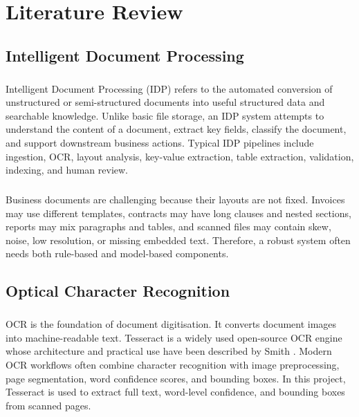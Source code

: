 \chapter{Literature Review}
\label{chap:literature_review}

\section{Intelligent Document Processing}
\paragraph{} Intelligent Document Processing (IDP) refers to the automated conversion of unstructured or semi-structured documents into useful structured data and searchable knowledge. Unlike basic file storage, an IDP system attempts to understand the content of a document, extract key fields, classify the document, and support downstream business actions. Typical IDP pipelines include ingestion, OCR, layout analysis, key-value extraction, table extraction, validation, indexing, and human review.

\paragraph{} Business documents are challenging because their layouts are not fixed. Invoices may use different templates, contracts may have long clauses and nested sections, reports may mix paragraphs and tables, and scanned files may contain skew, noise, low resolution, or missing embedded text. Therefore, a robust system often needs both rule-based and model-based components.

\section{Optical Character Recognition}
\paragraph{} OCR is the foundation of document digitisation. It converts document images into machine-readable text. Tesseract is a widely used open-source OCR engine whose architecture and practical use have been described by Smith \cite{smith2007tesseract}. Modern OCR workflows often combine character recognition with image preprocessing, page segmentation, word confidence scores, and bounding boxes. In this project, Tesseract is used to extract full text, word-level confidence, and bounding boxes from scanned pages.

